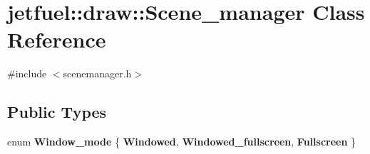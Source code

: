 \hypertarget{classjetfuel_1_1draw_1_1Scene__manager}{}\section{jetfuel\+:\+:draw\+:\+:Scene\+\_\+manager Class Reference}
\label{classjetfuel_1_1draw_1_1Scene__manager}


{\ttfamily \#include $<$scenemanager.\+h$>$}

\subsection*{Public Types}
\begin{DoxyCompactItemize}
\item 
\mbox{\label{classjetfuel_1_1draw_1_1Scene__manager_a010b9d9f4b59df95885f6c298d752956}} 
enum {\bfseries Window\+\_\+mode} \{ {\bfseries Windowed}, 
{\bfseries Windowed\+\_\+fullscreen}, 
{\bfseries Fullscreen}
 \}
\end{DoxyCompactItemize}
